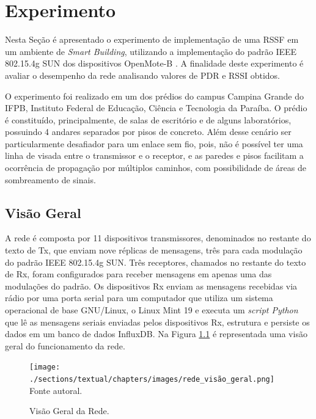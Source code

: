 \chapter{Experimento}
\label{experimento}

Nesta Seção é apresentado o experimento de implementação de uma RSSF em um ambiente de \emph{Smart Building}, utilizando a implementação do padrão IEEE 802.15.4g SUN dos dispositivos OpenMote-B \cite{tuset2020dataset}. A finalidade deste experimento é avaliar o desempenho da rede analisando valores de PDR e RSSI obtidos.

O experimento foi realizado em um dos prédios do campus Campina Grande do IFPB, Instituto Federal de Educação, Ciência e Tecnologia da Paraíba. O prédio é constituído, principalmente, de salas de escritório e de alguns laboratórios, possuindo 4 andares separados por pisos de concreto. Além desse cenário ser particularmente desafiador para um enlace sem fio, pois, não é possível ter uma linha de visada entre o transmissor e o receptor, e as paredes e pisos facilitam a ocorrência de propagação por múltiplos caminhos, com possibilidade de áreas de sombreamento de sinais.

\section{Visão Geral}
\label{subsec:visaogeral}
A rede é composta por 11 dispositivos transmissores, denominados no restante do texto de Tx, que enviam nove réplicas de mensagens, três para cada modulação do padrão IEEE 802.15.4g SUN. Três receptores, chamados no restante do texto de Rx, foram configurados para receber mensagens em apenas uma das modulações do padrão. Os dispositivos Rx enviam as mensagens recebidas via rádio por uma porta serial para um computador que utiliza um sistema operacional de base GNU/Linux, o Linux Mint 19 e executa um \emph{script Python} que lê as mensagens seriais enviadas pelos dispositivos Rx, estrutura e persiste os dados em um banco de dados InfluxDB. Na Figura \ref{fig:rede_visão_geral} é representada uma visão geral do funcionamento da rede.

\begin{figure}[h]
  \begin{center}
    \caption{Visão Geral da Rede.}
    \texttt{[image: ./sections/textual/chapters/images/rede\_visão\_geral.png]}\\
    Fonte autoral.
    \label{fig:rede_visão_geral}
  \end{center}
\end{figure}

